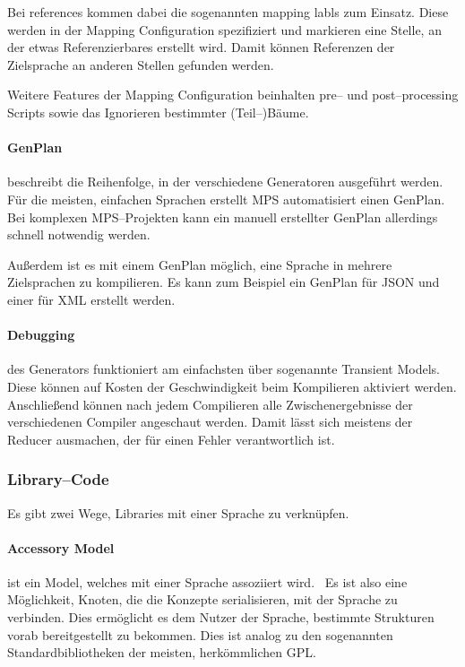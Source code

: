 Bei {\ttfamily references} kommen dabei die sogenannten {\ttfamily mapping labls} zum Einsatz.
Diese werden in der {\ttfamily Mapping Configuration} spezifiziert und markieren eine Stelle, an der etwas Referenzierbares erstellt wird.
Damit können Referenzen der Zielsprache an anderen Stellen gefunden werden.

Weitere Features der {\ttfamily Mapping Configuration} beinhalten pre-- und post--processing Scripts sowie das Ignorieren bestimmter (Teil--)Bäume.

\paragraph{GenPlan} beschreibt die Reihenfolge, in der verschiedene Generatoren ausgeführt werden.~\autocite{jetbrains-sro-no-dateB}
Für die meisten, einfachen Sprachen erstellt \ac{MPS} automatisiert einen GenPlan.
Bei komplexen \ac{MPS}--Projekten kann ein manuell erstellter GenPlan allerdings schnell notwendig werden.

Außerdem ist es mit einem GenPlan möglich, eine Sprache in mehrere Zielsprachen zu kompilieren.
Es kann zum Beispiel ein GenPlan für \ac{JSON} und einer für \ac{XML} erstellt werden.

\paragraph{Debugging} des Generators funktioniert am einfachsten über sogenannte Transient Models.~\autocite{jetbrains-sro-no-dateY}
Diese können auf Kosten der Geschwindigkeit beim Kompilieren aktiviert werden.
Anschließend können nach jedem Compilieren alle Zwischenergebnisse der verschiedenen Compiler angeschaut werden.
Damit lässt sich meistens der Reducer ausmachen, der für einen Fehler verantwortlich ist.

\subsubsection{Library--Code}
Es gibt zwei Wege, Libraries mit einer Sprache zu verknüpfen.

\paragraph{Accessory Model} ist ein Model, welches mit einer Sprache assoziiert wird.~\autocite{jetbrains-sro-no-dateZ}
Es ist also eine Möglichkeit, Knoten, die die Konzepte serialisieren, mit der Sprache zu verbinden.
Dies ermöglicht es dem Nutzer der Sprache, bestimmte Strukturen vorab bereitgestellt zu bekommen.
Dies ist analog zu den sogenannten Standardbibliotheken der meisten, herkömmlichen \ac{GPL}.

